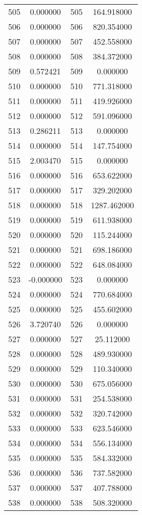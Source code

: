 \documentclass[12pt]{article}
\begin{document}
\begin{longtable}{@{}cccc@{}}
505 & 0.000000 & 505 & 164.918000 \\
506 & 0.000000 & 506 & 820.354000 \\
507 & 0.000000 & 507 & 452.558000 \\
508 & 0.000000 & 508 & 384.372000 \\
509 & 0.572421 & 509 & 0.000000 \\
510 & 0.000000 & 510 & 771.318000 \\
511 & 0.000000 & 511 & 419.926000 \\
512 & 0.000000 & 512 & 591.096000 \\
513 & 0.286211 & 513 & 0.000000 \\
514 & 0.000000 & 514 & 147.754000 \\
515 & 2.003470 & 515 & 0.000000 \\
516 & 0.000000 & 516 & 653.622000 \\
517 & 0.000000 & 517 & 329.202000 \\
518 & 0.000000 & 518 & 1287.462000 \\
519 & 0.000000 & 519 & 611.938000 \\
520 & 0.000000 & 520 & 115.244000 \\
521 & 0.000000 & 521 & 698.186000 \\
522 & 0.000000 & 522 & 648.084000 \\
523 & -0.000000 & 523 & 0.000000 \\
524 & 0.000000 & 524 & 770.684000 \\
525 & 0.000000 & 525 & 455.602000 \\
526 & 3.720740 & 526 & 0.000000 \\
527 & 0.000000 & 527 & 25.112000 \\
528 & 0.000000 & 528 & 489.930000 \\
529 & 0.000000 & 529 & 110.340000 \\
530 & 0.000000 & 530 & 675.056000 \\
531 & 0.000000 & 531 & 254.538000 \\
532 & 0.000000 & 532 & 320.742000 \\
533 & 0.000000 & 533 & 623.546000 \\
534 & 0.000000 & 534 & 556.134000 \\
535 & 0.000000 & 535 & 584.332000 \\
536 & 0.000000 & 536 & 737.582000 \\
537 & 0.000000 & 537 & 407.788000 \\
538 & 0.000000 & 538 & 508.320000 \\

\end{longtable}
\end{document}
